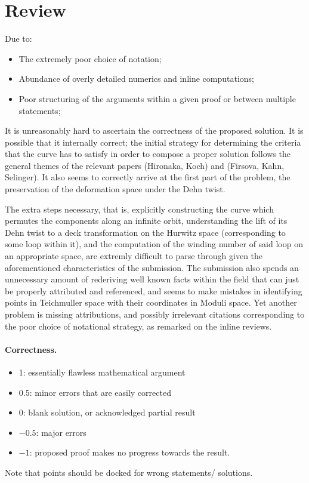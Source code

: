 \documentclass[11pt]{article}
\theoremstyle{definition}
\begin{document}
\maketitle

\section{Review}

Due to:
\begin{itemize}
    \item The extremely poor choice of notation;

    \item Abundance of overly detailed numerics and inline computations;

    \item Poor structuring of the arguments within a given proof or between multiple statements;
\end{itemize}
It is unreasonably hard to ascertain the correctness of the proposed solution. It is possible that it internally correct; the initial strategy for determining the criteria that the curve has to satisfy in order to compose a proper solution follows the general themes of the relevant papers (Hironaka, Koch) and (Firsova, Kahn, Selinger). It also seems to correctly arrive at the first part of the problem, the preservation of the deformation space under the Dehn twist. 

The extra steps necessary, that is, explicitly constructing the curve which permutes the components along an infinite orbit, understanding the lift of its Dehn twist to a deck transformation on the Hurwitz space (corresponding to some loop within it), and the computation of the winding number of said loop on an appropriate space, are extremly difficult to parse through given the aforementioned characteristics of the submission. The submission also spends an unnecessary amount of rederiving well known facts within the field that can just be properly attributed and referenced, and seems to make mistakes in identifying points in Teichmuller space with their coordinates in Moduli space. Yet another problem is missing attributions, and possibly irrelevant citations corresponding to the poor choice of notational strategy, as remarked on the inline reviews.

\paragraph{Correctness.}
\begin{itemize}
	\item  1: essentially flawless mathematical argument
	\item  0.5: minor errors that are easily corrected
	\item  0: blank solution, or acknowledged partial result
	\item  $-0.5$: major errors
	\item  $-1$: proposed proof makes no progress towards the result.
\end{itemize}
Note that points should be docked for wrong statements/ solutions.
\end{document}

